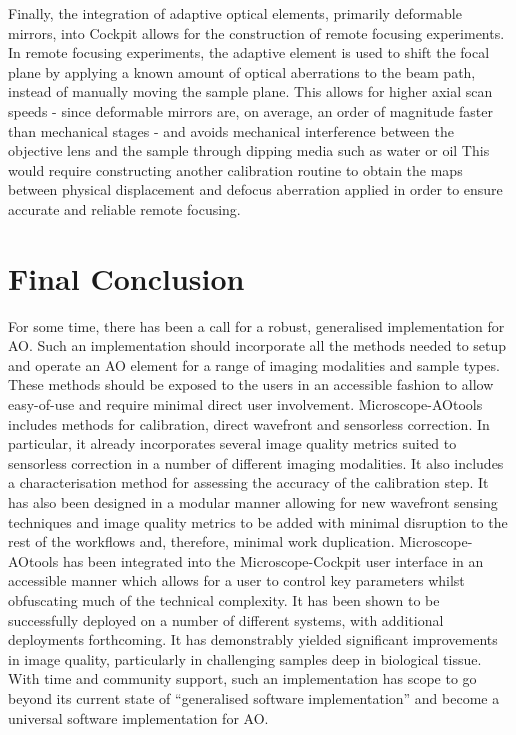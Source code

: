 Finally, the integration of adaptive optical elements, primarily deformable 
mirrors, into Cockpit allows for the construction of remote focusing 
experiments. In remote focusing experiments, the adaptive element is used 
to shift the focal plane by applying a known amount of optical aberrations 
to the beam path, instead of manually moving the sample plane. This allows 
for higher axial scan speeds - since deformable mirrors are, on average, an 
order of magnitude faster than mechanical stages - and avoids mechanical 
interference between the objective lens and the sample through dipping 
media such as water or oil\cite{botcherby2008optical,vzurauskas2017rapid} 
This would require constructing another calibration routine to obtain the 
maps between physical displacement and defocus aberration applied in order 
to ensure accurate and reliable remote focusing.

\section{Final Conclusion}
\label{sec:final_conclusion}

For some time, there has been a call for a robust, generalised implementation 
for AO. Such an implementation should incorporate all the methods needed to
setup and operate an AO element for a range of imaging modalities and sample 
types. These methods should be exposed to the users in an accessible fashion 
to allow easy-of-use and require minimal direct user involvement. 
Microscope-AOtools includes methods for calibration, direct wavefront and 
sensorless correction. In particular, it already incorporates several image 
quality metrics suited to sensorless correction in a number of different 
imaging modalities. It also includes a characterisation method for assessing 
the accuracy of the calibration step. It has also been designed in a modular 
manner allowing for new wavefront sensing techniques and image quality 
metrics to be added with minimal disruption to the rest of the workflows and, 
therefore, minimal work duplication. Microscope-AOtools has been integrated 
into the Microscope-Cockpit user interface in an accessible manner which 
allows for a user to control key parameters whilst obfuscating much of the 
technical complexity. It has been shown to be successfully deployed on a 
number of different systems, with additional deployments forthcoming. It has 
demonstrably yielded significant improvements in image quality, particularly 
in challenging samples deep in biological tissue. With  time and community 
support, such an implementation has scope to go beyond its  current state of 
``generalised software implementation'' and become a universal software 
implementation for AO.